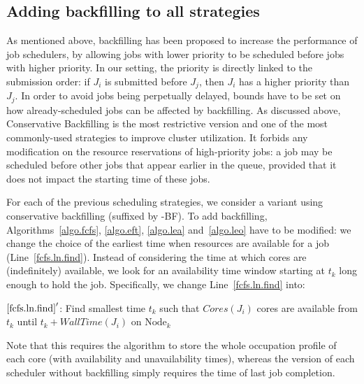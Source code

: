 \documentclass[conference,10pt]{IEEEtran}
\newcommand{\Node}[1]{\ensuremath{\mathrm{Node}_{#1}}\xspace}
\newcommand{\core}{\mathit{Cores}\xspace}
\newcommand{\walltime}{\mathit{WallTime}\xspace}
\begin{document}
\subsection{Adding backfilling to all strategies}

As mentioned above, backfilling has been proposed to increase the
performance of job schedulers, by allowing jobs with lower priority to be
scheduled before jobs with higher priority. In our setting, the
priority is directly linked to the submission order: if $J_i$ is
submitted before $J_j$, then $J_i$ has a higher priority than $J_j$.
In order to avoid jobs
being perpetually delayed, bounds have to be set on how already-scheduled
jobs can be affected by backfilling. As discussed above,
Conservative Backfilling is the most restrictive version and one of
the most commonly-used strategies to improve cluster utilization. It
forbids any modification on the resource
reservations of high-priority jobs: a job may be scheduled
before other jobs that appear earlier in the queue, provided that it
does not impact the starting time of these jobs.


For each of the previous scheduling strategies, we consider a variant
using conservative backfilling (suffixed by -BF).  To add
backfilling, Algorithms~\ref{algo.fcfs}, \ref{algo.eft},
\ref{algo.lea} and~\ref{algo.leo} have to be modified: we change the
choice of the earliest time when resources are available for a job
(Line~\ref{fcfs.ln.find}). Instead of considering the time at which
cores are (indefinitely) available, we look for an availability time
window starting at $t_k$ long enough to hold the
job. Specifically, we change Line~\ref{fcfs.ln.find} into:
\begin{algorithmic}[0]
  \State $\ref{fcfs.ln.find}'$: Find smallest time $t_k$ such that $\core(J_i)$ cores are
  available from $t_k$ until $t_k + \walltime(J_i)$ on $\Node{k}$
\end{algorithmic}

Note that this requires the algorithm to store  the whole occupation profile of
each core (with availability and unavailability times), whereas the
version of each scheduler without backfilling simply requires the time
of last job completion.
\end{document}
